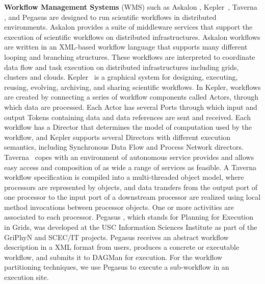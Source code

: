 \textbf{Workflow Management Systems} (WMS) such as Askalon \cite{Wieczorek2005}, Kepler~\cite{kepler}, Taverna \cite{Oinn2004}, and Pegasus \cite{Deelman2004} are designed to run scientific workflows in distributed environments. 
Askalon \cite{Fahringer2005} provides a suite of middleware services that support the execution of scientific workflows on distributed infrastructures. Askalon workflows are written in an XML-based workflow language that supports many different looping and branching structures. These workflows are interpreted to coordinate data flow and task execution on distributed infrastructures including grids, clusters and clouds.
Kepler~\cite{kepler} is a graphical system for designing, executing, reusing, evolving, archiving, and sharing scientific workflows. In Kepler, workflows are created by connecting a series of workflow components called Actors, through which data are processed. Each Actor has several Ports through which input and output Tokens containing data and data references are sent and received. Each workflow has a Director that determines the model of computation used by the workflow, and Kepler supports several Directors with different execution semantics, including Synchronous Data Flow and Process Network directors.
Taverna~\cite{Oinn2004} copes with an environment of autonomous service provides and allows easy access and composition of as wide a range of services as feasible. A Taverna workflow specification is compiled into a multi-threaded object model, where processors are represented by objects, and data transfers from the output port of one processor to the input port of a downstream processor are realized using local method invocations between processor objects. One or more activities are associated to each processor. 
Pegasus \cite{Deelman2004}, which stands for Planning for Execution in Grids, was developed at the USC Information Sciences Institute as part of the GriPhyN \cite{Deelman2002} and SCEC/IT \cite{Maechling2007} projects. Pegasus receives an abstract workflow description in a XML format from users, produces a concrete or executable workflow, and submits it to DAGMan for execution. For the workflow partitioning techniques, we use Pegasus to execute a sub-workflow in an execution site. 

